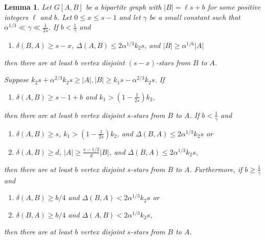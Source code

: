 \documentclass[oneside,12pt]{memoir}
\newtheorem{lemma}[theorem]{Lemma}
\begin{document}
\begin{lemma}\label{STARSlemma}
Let $G[A,B]$ be a bipartite graph with 
$|B|=\ell s+b$ for some positive integers $\ell$ and $b$.  Let $0\leq x\leq s-1$ and let $\gamma$ be a small constant such that $\alpha^{1/3}\ll \gamma\ll \frac{1}{2s}$.  If $b<\frac{1}{\gamma}$ and
\begin{enumerate}
\item $\delta(B,A)\geq s-x$, $\Delta(A,B)\leq 2\alpha^{1/3}k_2s$, and $|B|\geq \alpha^{1/6}|A|$
\end{enumerate}
then there are at least $b$ vertex disjoint $(s-x)$-stars from $B$ to $A$.

Suppose $k_2s+\alpha^{2/3}k_2s\geq |A|, |B|\geq k_1s-\alpha^{2/3}k_2s$.  If
\begin{enumerate}[resume]
\item $\delta(A,B)\geq s-1+b$ and $k_1>(1-\frac{1}{2s})k_2$,
\end{enumerate}
then there are at least $b$ vertex disjoint $s$-stars from $B$ to $A$.  If $b<\frac{1}{\gamma}$ and
\begin{enumerate}[resume]

\item $\delta(A,B)\geq s$, $k_1>(1-\frac{1}{2s})k_2$, and $\Delta(B,A)\leq 2\alpha^{1/3}k_2s$ or

\item $\delta(A,B)\geq d$, $|A|\geq \frac{s-1/2}{d}|B|$, and $\Delta(B,A)\leq 2\alpha^{1/3}k_2s$,
\end{enumerate}
then there are at least $b$ vertex disjoint $s$-stars from $B$ to $A$.  Furthermore, if $b\geq \frac{1}{\gamma}$ and 
\begin{enumerate}[resume]
\item $\delta(A,B)\geq b/4$ and $\Delta(B,A)<2\alpha^{1/3}k_2s$ or

\item $\delta(B,A)\geq b/4$ and $\Delta(A,B)<2\alpha^{1/3}k_2s$,

\end{enumerate}
then there are at least $b$ vertex disjoint $s$-stars from $B$ to $A$.

\end{lemma}
\end{document}
